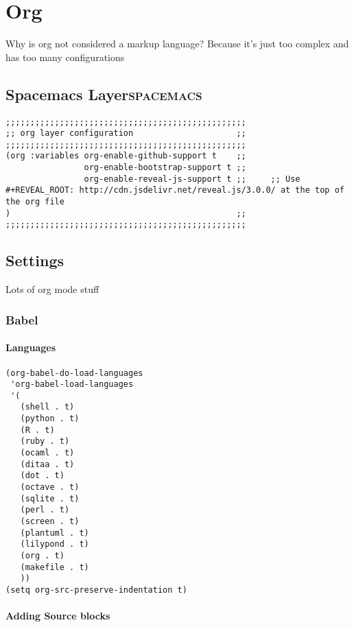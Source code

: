 \documentclass[11pt]{article}
\begin{document}
\section{Org}
\label{sec:org0ea0e95}
Why is org not considered a markup language? Because it's just too complex and has too many configurations
\subsection{Spacemacs Layer\hfill{}\textsc{spacemacs}}
\label{sec:org767d295}
\begin{verbatim}
;;;;;;;;;;;;;;;;;;;;;;;;;;;;;;;;;;;;;;;;;;;;;;;;;
;; org layer configuration                     ;;
;;;;;;;;;;;;;;;;;;;;;;;;;;;;;;;;;;;;;;;;;;;;;;;;;
(org :variables org-enable-github-support t    ;;
                org-enable-bootstrap-support t ;;
                org-enable-reveal-js-support t ;;     ;; Use #+REVEAL_ROOT: http://cdn.jsdelivr.net/reveal.js/3.0.0/ at the top of the org file
)                                              ;;
;;;;;;;;;;;;;;;;;;;;;;;;;;;;;;;;;;;;;;;;;;;;;;;;;
\end{verbatim}


\subsection{Settings}
\label{sec:org6e13ae2}
Lots of org mode stuff


\subsubsection{Babel}
\label{sec:org3f7c8ae}
\paragraph{Languages}
\label{sec:org2c81c24}
\begin{verbatim}
(org-babel-do-load-languages
 'org-babel-load-languages
 '(
   (shell . t)
   (python . t)
   (R . t)
   (ruby . t)
   (ocaml . t)
   (ditaa . t)
   (dot . t)
   (octave . t)
   (sqlite . t)
   (perl . t)
   (screen . t)
   (plantuml . t)
   (lilypond . t)
   (org . t)
   (makefile . t)
   ))
(setq org-src-preserve-indentation t)
\end{verbatim}

\paragraph{Adding Source blocks}
\label{sec:org8cefd7e}
\end{document}
